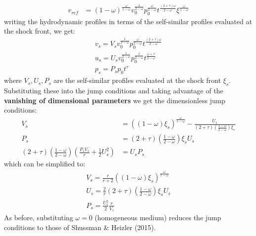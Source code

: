 \documentclass[11pt]{article}
\begin{document}
\begin{enumerate}
\begin{equation}
\begin{aligned}
    v_{ref} &= (1-\omega)^{\frac{\omega}{1-\omega}} v_0^{\frac{1}{2-\omega}} p_0^{\frac{\omega}{2-\omega}} t^{\frac{(2+\tau)\omega}{2-\omega}} \xi^{\frac{\omega}{1-\omega}}
    \end{aligned}
  \end{equation}
  writing the hydrodynamic profiles in terms of the self-similar profiles evaluated at the shock front, we get:
  \begin{equation}
    \begin{aligned} 
    v_s = V_s v_0^{\frac{1}{2-\omega}} p_0^{\frac{\omega}{2-\omega}} t^{\frac{(2+\tau)\omega}{2-\omega}} \\
    u_s = U_s v_0^{\frac{1}{2-\omega}} p_0^{\frac{1}{2-\omega}} t^{\frac{\omega + \tau}{2-\omega}} \\
    p_s = P_s p_0 t^\tau
    \end{aligned}
  \end{equation}
  where $V_s, U_s, P_s$ are the self-similar profiles evaluated at the shock front $\xi_s$. Substituting these into the jump conditions and taking advantage of the \textbf{vanishing of dimensional parameters} we get the dimensionless jump conditions:
  \begin{equation}
    \begin{aligned}
    V_s &= \left((1-\omega)\xi_s\right)^{\frac{\omega}{1-\omega}} - \frac{U_s}{(2+\tau)\left(\frac{1-\omega}{2-\omega}\right)\xi_s} \\
    P_s &= (2+\tau)\left(\frac{1-\omega}{2-\omega}\right)\xi_s U_s \\
    (2+\tau)\left(\frac{1-\omega}{2-\omega}\right) \left(\frac{P_s V_s}{r} + \frac{1}{2} U_s^2\right) &= U_s P_s
    \end{aligned}
  \end{equation}
  which can be simplified to:
  \begin{equation}
    \begin{aligned}
    V_s = \frac{r}{r+2} \left((1-\omega)\xi_s\right)^{\frac{\omega}{1-\omega}} \\
    U_s = \frac{2}{r} (2+\tau)\left(\frac{1-\omega}{2-\omega}\right)\xi_s U_s \\
    P_s = \frac{U_s^2}{2} \frac{r}{V_s}
    \end{aligned}
  \end{equation}
  As before, substituting $\omega = 0$ (homogeneous medium) reduces the jump conditions to those of Shussman \& Heizler (2015).

\end{enumerate}
\end{document}
